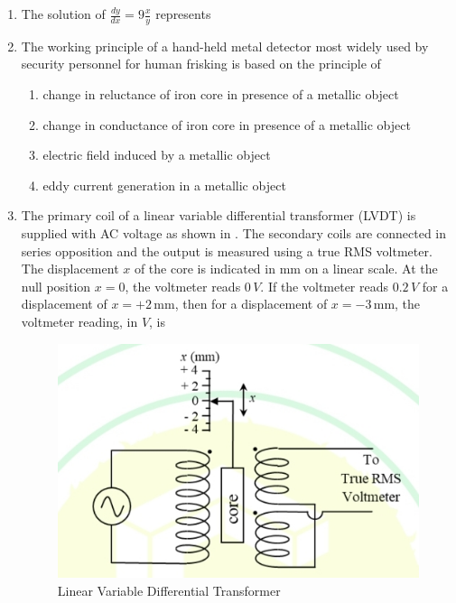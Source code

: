 \documentclass[journal,12pt,onecolumn]{IEEEtran}
\theoremstyle{remark}
\begin{document}
\begin{enumerate}
\item The solution of $\frac{dy}{dx} = 9\frac{x}{y}$ represents
\par\hfill{}
\begin{enumerate}
\end{enumerate}

\item The working principle of a hand-held metal detector most widely used by security personnel for human frisking is based on the principle of
\par\hfill{}
\begin{enumerate}
\item change in reluctance of iron core in presence of a metallic object
\item change in conductance of iron core in presence of a metallic object
\item electric field induced by a metallic object
\item eddy current generation in a metallic object
\end{enumerate}


\item The primary coil of a linear variable differential transformer (LVDT) is supplied with AC voltage as shown in . The secondary coils are connected in series opposition and the output is measured using a true RMS voltmeter.  
The displacement $x$ of the core is indicated in mm on a linear scale. At the null position $x = 0$, the voltmeter reads $0 \, V$. If the voltmeter reads $0.2 \, V$ for a displacement of $x = +2 \, \text{mm}$, then for a displacement of $x = -3 \, \text{mm}$, the voltmeter reading, in $V$, is \par\hfill{}

\begin{figure}[H]
    \centering
    \includegraphics[width=0.5\columnwidth]{Figs/Q-14.jpg}
    \caption{Linear Variable Differential Transformer}
    \label{14}
\end{figure}


\end{enumerate}
\end{document}
